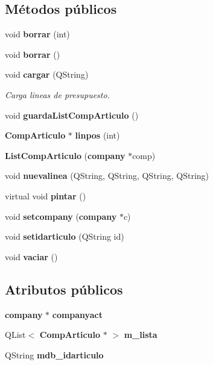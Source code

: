 \subsection*{M\'{e}todos p\'{u}blicos}
\begin{CompactItemize}
\item 
void {\bf borrar} (int)\label{classListCompArticulo_a0}

\item 
void {\bf borrar} ()\label{classListCompArticulo_a1}

\item 
void {\bf cargar} (QString)
\begin{CompactList}\small\item\em Carga lineas de presupuesto. \item\end{CompactList}\item 
void {\bf guarda\-List\-Comp\-Articulo} ()\label{classListCompArticulo_a3}

\item 
{\bf Comp\-Articulo} $\ast$ {\bf linpos} (int)\label{classListCompArticulo_a4}

\item 
{\bf List\-Comp\-Articulo} ({\bf company} $\ast$comp)\label{classListCompArticulo_a6}

\item 
void {\bf nuevalinea} (QString, QString, QString, QString)\label{classListCompArticulo_a7}

\item 
virtual void {\bf pintar} ()\label{classListCompArticulo_a8}

\item 
void {\bf setcompany} ({\bf company} $\ast$c)\label{classListCompArticulo_a9}

\item 
void {\bf setidarticulo} (QString id)\label{classListCompArticulo_a10}

\item 
void {\bf vaciar} ()\label{classListCompArticulo_a11}

\end{CompactItemize}
\subsection*{Atributos p\'{u}blicos}
\begin{CompactItemize}
\item 
{\bf company} $\ast$ {\bf companyact}\label{classListCompArticulo_o0}

\item 
QList$<$ {\bf Comp\-Articulo} $\ast$ $>$ {\bf m\_\-lista}\label{classListCompArticulo_o1}

\item 
QString {\bf mdb\_\-idarticulo}\label{classListCompArticulo_o2}

\end{CompactItemize}



